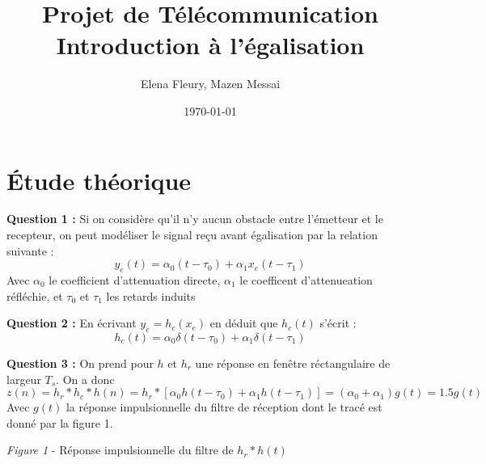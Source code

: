 \documentclass[12pt,a4paper]{article}
\title{Projet de Télécommunication\\\large Introduction à l'égalisation}
\author{Elena Fleury, Mazen Messai}
\date{\today}
\begin{document}
\maketitle

\section{Étude théorique}
\textbf{Question 1 :}
Si on considère qu'il n'y aucun obstacle entre l'émetteur et le recepteur, on peut modéliser le signal reçu avant égalisation par la relation suivante :
\[
y_e(t) = \alpha_0 (t-\tau_0) + \alpha_1 x_e(t-\tau_1)
\]
Avec $\alpha_0$ le coefficient d'attenuation directe, $\alpha_1$ le coefficent d'attenueation réfléchie, et $\tau_0$ et $\tau_1$ les retards induits
\newline \par

\textbf{Question 2 :}
En écrivant $y_e = h_c(x_e)$ en déduit que $h_c(t)$ s'écrit :
\[
h_c(t) = \alpha_0 \delta(t-\tau_0) + \alpha_1 \delta(t-\tau_1)
\]
\newline \par

\textbf{Question 3 :}
On prend pour $h$ et $h_r$ une réponse en fenêtre réctangulaire de largeur $T_s$.
On a donc  $z(n) = h_r * h_c * h(n) = h_r * [\alpha_0 h(t-\tau_0) + \alpha_1 h(t-\tau_1)] = (\alpha_0 + \alpha_1)g(t) = 1.5 g(t)$
Avec $g(t)$ la réponse impulsionnelle du filtre de réception dont le tracé est donné par la figure 1.
\begin{center}
\end{center}
\begin{center}\textit{Figure 1} - Réponse impulsionnelle du filtre de $h_r * h(t)$\end{center}
\end{document}

